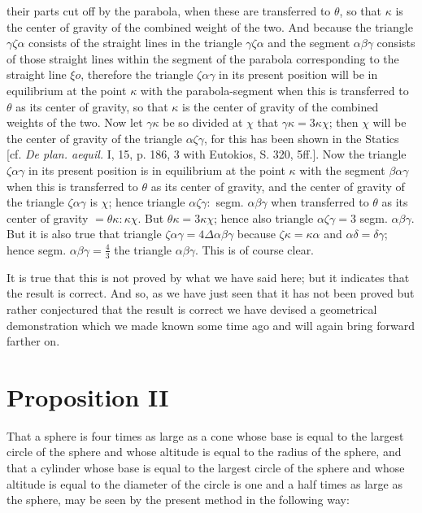 \documentclass[12pt]{article}
\begin{document}
their parts cut off by the parabola, when these are transferred to
$\theta$, so that $\kappa$ is the center of gravity of the combined
weight of the two. And because the triangle $\gamma\zeta\alpha$
consists of the straight lines in the triangle $\gamma\zeta\alpha$ and
the segment $\alpha\beta\gamma$ consists of those straight lines
within the segment of the parabola corresponding to the straight line
$\xi o$, therefore the triangle $\zeta\alpha\gamma$ in its present
position will be in equilibrium at the point $\kappa$ with the
parabola-segment when this is transferred to $\theta$ as its center of
gravity, so that $\kappa$ is the center of gravity of the combined
weights of the two. Now let $\gamma\kappa$ be so divided at $\chi$
that $\gamma\kappa = 3\kappa\chi$; then $\chi$ will be the center of
gravity of the triangle $\alpha\zeta\gamma$, for this has been shown
in the Statics [cf. \emph{De plan. aequil.} I, 15, p. 186, 3 with
Eutokios, S. 320, 5ff.]. Now the triangle $\zeta\alpha\gamma$ in its
present position is in equilibrium at the point $\kappa$ with the
segment $\beta\alpha\gamma$ when this is transferred to $\theta$ as
its center of gravity, and the center of gravity of the triangle
$\zeta\alpha\gamma$ is $\chi$; hence triangle $\alpha\zeta\gamma : $
segm. $\alpha\beta\gamma$ when transferred to $\theta$ as its center
of gravity $= \theta\kappa : \kappa\chi$. But $\theta\kappa =
3\kappa\chi$; hence also triangle $\alpha\zeta\gamma = 3$
segm. $\alpha\beta\gamma$.  But it is also true that triangle
$\zeta\alpha\gamma = 4\Delta\alpha\beta\gamma$ because $\zeta\kappa =
\kappa\alpha$ and $\alpha\delta = \delta\gamma$; hence
segm. $\alpha\beta\gamma = \frac{4}{3}$ the triangle
$\alpha\beta\gamma$. This is of course clear.

It is true that this is not proved by what we have said here; but it
indicates that the result is correct. And so, as we have just seen
that it has not been proved but rather conjectured that the result is
correct we have devised a geometrical demonstration which we made
known some time ago and will again bring forward farther on.


\section*{Proposition II}

That a sphere is four times as large as a cone whose base is equal to
the largest circle of the sphere and whose altitude is equal to the
radius of the sphere, and that a cylinder whose base is equal to the
largest circle of the sphere and whose altitude is equal to the
diameter of the circle is one and a half times as large as the sphere,
may be seen by the present method in the following way:
\end{document}

